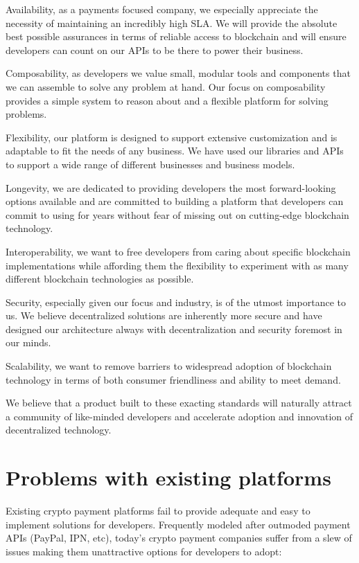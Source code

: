 \documentclass[11pt]{article}
\begin{document}
Availability, as a payments focused company, we especially appreciate the necessity of maintaining an incredibly high SLA. We will provide the absolute best possible assurances in terms of reliable access to blockchain and will ensure developers can count on our APIs to be there to power their business.


Composability, as developers we value small, modular tools and components that we can assemble to solve any problem at hand. Our focus on composability provides a simple system to reason about and a flexible platform for solving problems.


Flexibility, our platform is designed to support extensive customization and is adaptable to fit the needs of any business. We have used our libraries and APIs to support a wide range of different businesses and business models.


Longevity, we are dedicated to providing developers the most forward-looking options available and are committed to building a platform that developers can commit to using for years without fear of missing out on cutting-edge blockchain technology.


Interoperability, we want to free developers from caring about specific blockchain implementations while affording them the flexibility to experiment with as many different blockchain technologies as possible.


Security, especially given our focus and industry, is of the utmost importance to us. We believe decentralized solutions are inherently more secure and have designed our architecture always with decentralization and security foremost in our minds.


Scalability, we want to remove barriers to widespread adoption of blockchain technology in terms of both consumer friendliness and ability to meet demand.


We believe that a product built to these exacting standards will naturally attract a community of like-minded developers and accelerate adoption and innovation of decentralized technology.


\section{Problems with existing platforms}

Existing crypto payment platforms fail to provide adequate and easy to implement solutions for developers. Frequently modeled after outmoded payment APIs (PayPal, IPN, etc), today's crypto payment companies suffer from a slew of issues making them unattractive options for developers to adopt:
\end{document}
